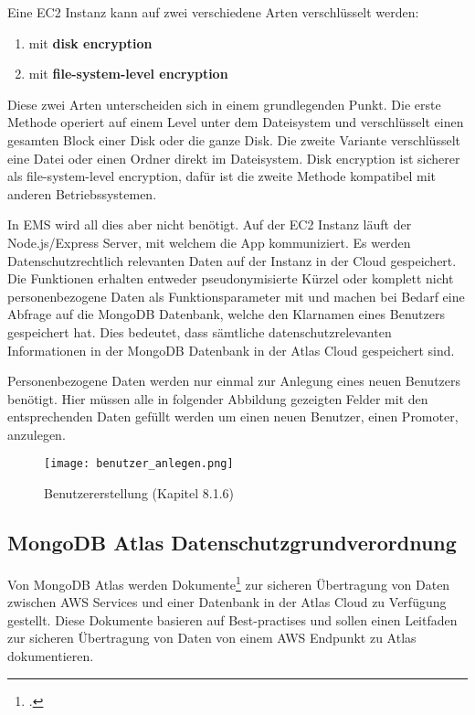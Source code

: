 Eine EC2 Instanz kann auf zwei verschiedene Arten verschlüsselt werden:
\begin{enumerate}
	\item mit \textbf{disk encryption}
	\item mit \textbf{file-system-level encryption}
\end{enumerate}
Diese zwei Arten unterscheiden sich in einem grundlegenden Punkt. Die erste Methode operiert auf einem Level unter dem Dateisystem und verschlüsselt einen gesamten Block einer Disk oder die ganze Disk. Die zweite Variante
verschlüsselt eine Datei oder einen Ordner direkt im Dateisystem. Disk encryption ist sicherer als file-system-level encryption, dafür ist die zweite Methode kompatibel mit anderen Betriebssystemen.

In EMS wird all dies aber nicht benötigt. Auf der EC2 Instanz läuft der Node.js/Express Server, mit welchem die App kommuniziert. Es werden Datenschutzrechtlich
relevanten Daten auf der Instanz in der Cloud gespeichert.
Die Funktionen erhalten entweder pseudonymisierte Kürzel oder komplett nicht personenbezogene Daten als Funktionsparameter mit und machen bei Bedarf eine Abfrage auf die MongoDB Datenbank,
welche den Klarnamen eines Benutzers gespeichert hat. Dies bedeutet, dass sämtliche datenschutzrelevanten Informationen in der MongoDB Datenbank in der Atlas Cloud gespeichert sind.

Personenbezogene Daten werden nur einmal zur Anlegung eines neuen Benutzers benötigt. Hier müssen alle in folgender Abbildung gezeigten Felder mit den entsprechenden Daten gefüllt werden um einen neuen Benutzer, einen Promoter, anzulegen.
\begin{center}
	\begin{figure}[h]
		\centering
		\texttt{[image: benutzer\_anlegen.png]}
		\caption{Benutzererstellung (Kapitel 8.1.6)}
	\end{figure}
\end{center}

\subsection{MongoDB Atlas Datenschutzgrundverordnung}
Von MongoDB Atlas werden Dokumente\footcite{atlas-doku-aws} zur sicheren Übertragung von Daten zwischen AWS Services und einer Datenbank in der Atlas Cloud zu Verfügung gestellt. Diese Dokumente basieren auf Best-practises und sollen einen Leitfaden zur
sicheren Übertragung von Daten von einem AWS Endpunkt zu Atlas dokumentieren.

